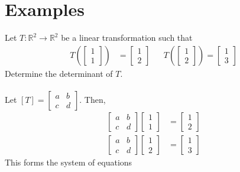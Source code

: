\documentclass[letterpaper,12pt]{article}
\begin{document}
\section*{Examples}
\begin{example}
Let $T: \mathbb{R}^2 \rightarrow \mathbb{R}^2$ be a linear transformation such that
\begin{align*}
    T\left(\begin{bmatrix} 1 \\ 1 \end{bmatrix} \right) & = \begin{bmatrix} 1 \\ 2 \end{bmatrix} && T\left(\begin{bmatrix} 1 \\ 2 \end{bmatrix} \right) = \begin{bmatrix} 1 \\ 3 \end{bmatrix}
\end{align*}
Determine the determinant of $T$.
\\ \\ Let $[T] = \begin{bmatrix} a & b \\ c & d \end{bmatrix}$. Then,
\begin{align*}
    \begin{bmatrix} a & b \\ c & d \end{bmatrix} \begin{bmatrix} 1 \\ 1 \end{bmatrix} & = \begin{bmatrix} 1 \\ 2 \end{bmatrix} \\
    \begin{bmatrix} a & b \\ c & d \end{bmatrix} \begin{bmatrix} 1 \\ 2 \end{bmatrix} & = \begin{bmatrix} 1 \\ 3 \end{bmatrix}
\end{align*}
This forms the system of equations
\begin{align*}

\end{align*}
\end{example}
\end{document}
